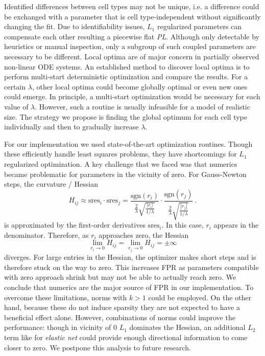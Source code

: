 \documentclass{bioinfo}
\begin{document}
Identified differences between cell types may not be unique, i.e. a difference could be exchanged with a parameter that is cell type-independent without significantly changing the fit.
Due to identifiability issues, $L_1$ regularized parameters can compensate each other resulting a piecewise flat \emph{PL}.
Although only detectable by heuristics or manual inspection, only a subgroup of such coupled parameters are necessary to be different.
Local optima are of major concern in partially observed non-linear ODE systems.
An established method to discover local optima is to perform multi-start deterministic optimization and compare the results.
For a certain $\lambda$, other local optima could become globally optimal or even new ones could emerge.
In principle, a multi-start optimization would be necessary for each value of $\lambda$.
However, such a routine is usually infeasible for a model of realistic size.
The strategy we propose is finding the global optimum for each cell type individually and then to gradually increase $\lambda$.

For our implementation we used state-of-the-art optimization routines.
Though these efficiently handle least squares problems, they have shortcomings for $L_1$ regularized optimization.
A key challenge that we faced was that numerics became problematic for parameters in the vicinity of zero.
For Gauss-Newton steps, the curvature / Hessian
\begin{equation}
	H_{ij} \approx \text{sres}_i \cdot \text{sres}_j = \frac{\text{sgn}(r_i)}{\frac{2}{\lambda}\sqrt{\frac{|r_i|}{1/\lambda}}} \cdot \frac{\text{sgn}(r_j)}{\frac{2}{\lambda}\sqrt{\frac{|r_j|}{1/\lambda}}} \:.
\end{equation}
is approximated by the first-order derivatives $\text{sres}_{i}$.
In this case, $r_i$ appears in the denominator. Therefore, as $r_i$ approaches zero, the Hessian
\begin{equation}
	\lim_{r_i \rightarrow 0} H_{ij} = \lim_{r_j \rightarrow 0} H_{ij} = \pm \infty
\end{equation}
diverges.
For large entries in the Hessian, the optimizer makes short steps and is therefore stuck on the way to zero.
This increases FPR as parameters compatible with zero approach shrink but may not be able to actually reach zero.
We conclude that numerics are the major source of FPR in our implementation.
To overcome these limitations, norms with $k>1$ could be employed.
On the other hand, because these do not induce sparsity they are not expected to have a beneficial effect alone.
However, combinations of norms could improve the performance:
though in vicinity of 0 $L_1$ dominates the Hessian, an additional $L_2$ term like for \emph{elastic net} could provide enough directional information to come closer to zero.
We postpone this analysis to future research.
\end{document}
